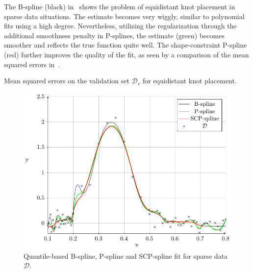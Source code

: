 The B-spline (black) in~ shows the problem of equidistant knot placement in sparse data situations. The estimate becomes very wiggly, similar to polynomial fits using a high degree. Nevertheless, utilizing the regularization through the additional smoothness penalty in P-splines, the estimate (green) becomes smoother and reflects the true function quite well. The shape-constraint P-spline (red) further improves the quality of the fit, as seen by a comparison of the mean squared errors in~. 

\begin{table}[H]
	\begin{center}
	\end{center}
	\caption{Mean squared errors on the validation set $\mathcal{D}_v$ for equidistant knot placement.}
	\label{tab:sparse-example-equidistant}
\end{table}


\begin{figure}[H]
	\centering
	\includegraphics{graphics/pgfplots/cha4/exp-sparse-quantile.pdf}
	\caption{Quantile-based B-spline, P-spline and SCP-spline fit for sparse data $\mathcal{D}$.}
	\label{fig:sparse-example-quantile}
\end{figure}

